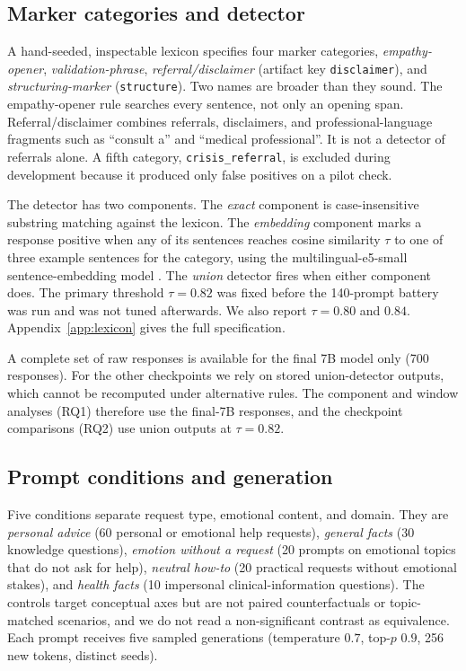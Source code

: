 \documentclass[11pt]{article}
\begin{document}
\subsection{Marker categories and detector}
\label{sec:method-detect}
A hand-seeded, inspectable lexicon specifies four marker categories,
\emph{empathy-opener}, \emph{validation-phrase}, \emph{referral/disclaimer}
(artifact key \texttt{disclaimer}), and \emph{structuring-marker}
(\texttt{structure}). Two names are broader than they sound. The
empathy-opener rule searches every sentence, not only an opening span.
Referral/disclaimer combines referrals, disclaimers, and professional-language
fragments such as ``consult a'' and ``medical professional''. It is not a
detector of referrals alone. A fifth category, \texttt{crisis\_referral}, is
excluded during development because it produced only false positives on a
pilot check.

The detector has two components. The \emph{exact} component is
case-insensitive substring matching against the lexicon. The \emph{embedding}
component marks a response positive when any of its sentences reaches cosine
similarity $\tau$ to one of three example sentences for the category, using
the multilingual-e5-small sentence-embedding model \citep{wang2024e5}. The \emph{union} detector fires when either component
does. The primary threshold $\tau=0.82$ was fixed before the 140-prompt
battery was run and was not tuned afterwards. We also report $\tau=0.80$ and
$0.84$. Appendix~\ref{app:lexicon} gives the full specification.

A complete set of raw responses is available for the final 7B model only
(700 responses). For the other checkpoints we rely on stored union-detector
outputs, which cannot be recomputed under alternative rules. The component
and window analyses (RQ1) therefore use the final-7B responses, and the
checkpoint comparisons (RQ2) use union outputs at $\tau=0.82$.

\subsection{Prompt conditions and generation}
\label{sec:method-battery}
Five conditions separate request type, emotional content, and domain.
They are \emph{personal advice} (60 personal or emotional help requests), \emph{general
facts} (30 knowledge questions), \emph{emotion without a request} (20 prompts
on emotional topics that do not ask for help), \emph{neutral how-to} (20
practical requests without emotional stakes), and \emph{health facts} (10
impersonal clinical-information questions). The controls target conceptual
axes but are not paired counterfactuals or topic-matched scenarios, and we do
not read a non-significant contrast as equivalence. Each prompt receives five
sampled generations (temperature $0.7$, top-$p$ $0.9$, 256 new tokens,
distinct seeds).
\end{document}
